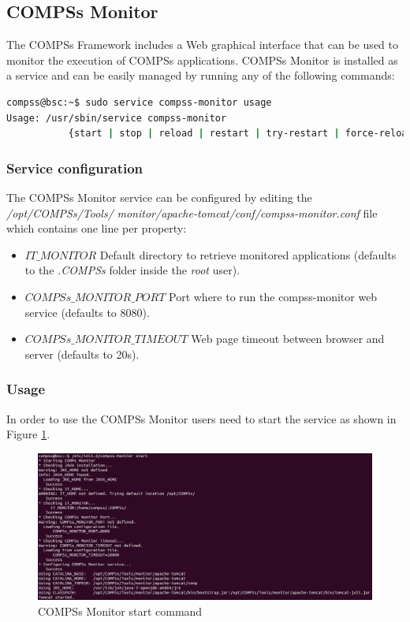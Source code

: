 \subsection{COMPSs Monitor}
\label{subsec:monitor}
The COMPSs Framework includes a Web graphical interface that can be used to monitor the execution of COMPSs applications. COMPSs Monitor is installed as a service and can be easily managed by running any of the following
commands:
\begin{lstlisting}[language=bash]
compss@bsc:~$ sudo service compss-monitor usage
Usage: /usr/sbin/service compss-monitor 
           {start | stop | reload | restart | try-restart | force-reload | status}
\end{lstlisting}

\subsubsection{Service configuration}
The COMPSs Monitor service can be configured by editing the \textit{/opt/COMPSs/Tools/}
\textit{monitor/apache-tomcat/conf/compss-monitor.conf}
file which contains one line per property:
\begin{itemize}
 \item \textbf{$IT\_MONITOR$} Default directory to retrieve monitored applications (defaults to the \textit{.COMPSs} folder inside the \textit{root} user).
 \item \textbf{$COMPSs\_MONITOR\_PORT$} Port where to run the compss-monitor web service (defaults to 8080).
 \item \textbf{$COMPSs\_MONITOR\_TIMEOUT$} Web page timeout between browser and server (defaults to 20s).
\end{itemize}

\subsubsection{Usage}
In order to use the COMPSs Monitor users need to start the service as shown in Figure \ref{fig:monitor_start}.
\begin{figure}[thb!]
  \centering
    \includegraphics[width=\textwidth]{./Sections/4_Tools/Figures/monitor_start.jpeg}
    \caption{COMPSs Monitor start command}
    \label{fig:monitor_start}
\end{figure}

